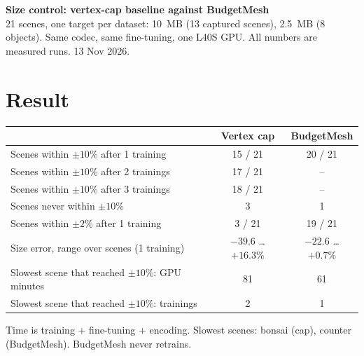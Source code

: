 \documentclass[10pt]{article}
\newcommand{\pct}{\%}
\begin{document}
{\large\bfseries Size control: vertex-cap baseline against BudgetMesh}\\[1pt]
{\small 21 scenes, one target per dataset: 10~MB (13 captured scenes), 2.5~MB (8 objects). Same codec, same fine-tuning, one L40S GPU. All numbers are measured runs. 13 Nov 2026.}

\section{Result}
\begin{table}[h!]\centering\small
\begin{tabular}{@{}lcc@{}}
\toprule
 & Vertex cap & BudgetMesh \\
\midrule
Scenes within $\pm10\pct$ after 1 training & 15 / 21 & 20 / 21 \\
Scenes within $\pm10\pct$ after 2 trainings & 17 / 21 & -- \\
Scenes within $\pm10\pct$ after 3 trainings & 18 / 21 & -- \\
Scenes never within $\pm10\pct$ & 3 & 1 \\
Scenes within $\pm2\pct$ after 1 training & 3 / 21 & 19 / 21 \\
Size error, range over scenes (1 training) & $-39.6$ \ldots $+16.3\pct$ & $-22.6$ \ldots $+0.7\pct$ \\
Slowest scene that reached $\pm10\pct$: GPU minutes & 81 & 61 \\
Slowest scene that reached $\pm10\pct$: trainings & 2 & 1 \\
\bottomrule
\end{tabular}
\end{table}
\vspace{-6pt}
Time is training + fine-tuning + encoding. Slowest scenes: bonsai (cap), counter (BudgetMesh). BudgetMesh never retrains.
\end{document}
